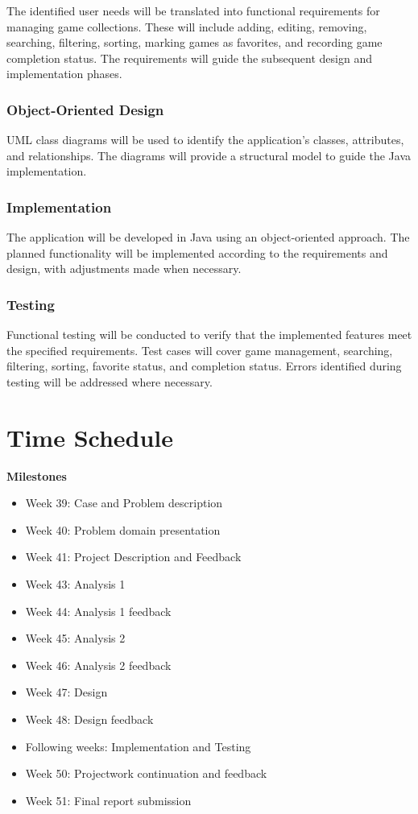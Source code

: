 \documentclass[11pt]{article}
\begin{document}
The identified user needs will be translated into functional requirements for managing game collections. These will include adding, editing, removing, searching, filtering, sorting, marking games as favorites, and recording game completion status. The requirements will guide the subsequent design and implementation phases.

\subsubsection{Object-Oriented Design}

UML class diagrams will be used to identify the application's classes, attributes, and relationships. The diagrams will provide a structural model to guide the Java implementation.

\subsubsection{Implementation}

The application will be developed in Java using an object-oriented approach. The planned functionality will be implemented according to the requirements and design, with adjustments made when necessary.

\subsubsection{Testing}

Functional testing will be conducted to verify that the implemented features meet the specified requirements. Test cases will cover game management, searching, filtering, sorting, favorite status, and completion status. Errors identified during testing will be addressed where necessary.


\newpage
\section{Time Schedule}

\textbf{Milestones }
\begin{itemize}
    \item Week 39: Case and Problem description
    \item Week 40: Problem domain presentation
    \item Week 41: Project Description and Feedback
    \item Week 43: Analysis 1
    \item Week 44: Analysis 1 feedback
    \item Week 45: Analysis 2
    \item Week 46: Analysis 2 feedback
    \item Week 47: Design
    \item Week 48: Design feedback
    \item Following weeks: Implementation and Testing
    \item Week 50: Projectwork continuation and feedback
    \item Week 51: Final report submission
\end{itemize}
\end{document}
